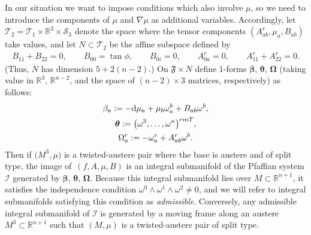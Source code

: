 \documentclass[pdftex]{sigma}
\def\R{\mathbb{R}}
\def\vOmega{\boldsymbol{\Omega}}
\def\vbeta{\boldsymbol{\beta}}
\def\vtheta{\boldsymbol{\theta}}
\def\vOmega{\boldsymbol{\Omega}}
\def\calS{\mathcal{S}}
\def\calT{\mathcal{T}}
\def\F{\mathfrak{F}}
\def\calI{\mathcal{I}}
\def\w{\omega}
\numberwithin{equation}{section}
\begin{document}
In our situation we want to impose conditions which also involve $\mu$, so we need to introduce the components of $\mu$ and $\nabla \mu$ as additional variables. Accordingly, let $\calT_2 = \calT_1 \times \R^3 \times \calS_3$ denote the space where the tensor components $(A^r_{ab}, \mu_a, B_{ab})$ take values, and let $N \subset \calT_2$ be the affine subspace defined by
\begin{gather} \label{splitedseqns}
B_{11}+B_{22}=0, \qquad
B_{00}=\tan\phi, \qquad
B_{0i}=0,\qquad
A^r_{0a}=0, \qquad
A^r_{11}+A^r_{22}=0.
\end{gather}
(Thus, $N$ has dimension $5+2(n-2)$.) On $\F \times N$ define $1$-forms $\vbeta$, $\vtheta$, $\vOmega$
(taking value in $\R^3$, $\R^{n-2}$, and the space of $(n-2)\times 3$ matrices, respectively) as follows:
\begin{subequations} \label{bigsysdef}
\begin{gather}
\beta_a := -{\rm d}\mu_a + \mu_b \w^b_a + B_{ab} \w^b,
\label{betadef} \\
\vtheta := \big(\w^3, \dots, \w^n\big)^{rm T}, \label{vthetadef}
\\
\Omega^r_a := -\w^r_a + A^r_{ab} \w^b. \label{Omegaradef}
\end{gather}
\end{subequations}
Then if $\big(M^3,\mu\big)$ is a twisted-austere pair where the base is austere and of split type, the image of~$(f,A,\mu,B)$ is an integral submanifold of the Pfaffian system $\calI$ generated by $\vbeta$, $\vtheta$, $\vOmega$. Because this integral submanifold lies over $M \subset \R^{n+1}$, it satisfies the independence condition $\w^0 \wedge \w^1 \wedge \w^2\ne 0$, and we will refer to integral submanifolds satisfying this condition as {\em admissible}. Conversely, any admissible integral submanifold of $\calI$ is generated by a moving frame along an austere $M^3 \subset \R^{n+1}$ such that $(M,\mu)$ is a twisted-austere pair of split type.
\end{document}
